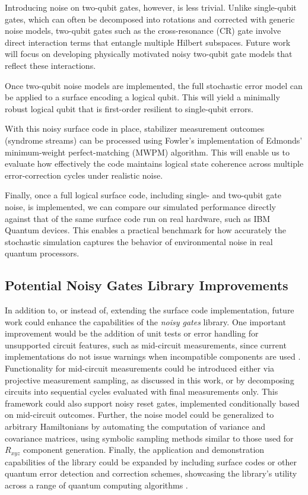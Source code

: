 \documentclass[9pt,a4paper,twocolumn,twoside]{tau-class/tau}
\begin{document}
Introducing noise on two-qubit gates, however, is less trivial. Unlike single-qubit gates, which can often be decomposed into rotations and corrected with generic noise models, two-qubit gates such as the cross-resonance (CR) gate involve direct interaction terms that entangle multiple Hilbert subspaces. Future work will focus on developing physically motivated noisy two-qubit gate models that reflect these interactions.

Once two-qubit noise models are implemented, the full stochastic error model can be applied to a surface encoding a logical qubit. This will yield a minimally robust logical qubit that is first-order resilient to single-qubit errors.

With this noisy surface code in place, stabilizer measurement outcomes (syndrome streams) can be processed using Fowler’s implementation of Edmonds’ minimum-weight perfect-matching (MWPM) algorithm. This will enable us to evaluate how effectively the code maintains logical state coherence across multiple error-correction cycles under realistic noise.

Finally, once a full logical surface code, including single- and two-qubit gate noise, is implemented, we can compare our simulated performance directly against that of the same surface code run on real hardware, such as IBM Quantum devices. This enables a practical benchmark for how accurately the stochastic simulation captures the behavior of environmental noise in real quantum processors.

\subsection*{Potential Noisy Gates Library Improvements}
In addition to, or instead of, extending the surface code implementation, future work could enhance the capabilities of the \textit{noisy gates} library. 
One important improvement would be the addition of unit tests or error handling for unsupported circuit features, such as mid-circuit measurements, since current implementations do not issue warnings when incompatible components are used \cite{quantum_gates_repo}. 
Functionality for mid-circuit measurements could be introduced either via projective measurement sampling, as discussed in this work, or by decomposing circuits into sequential cycles evaluated with final measurements only. This framework could also support noisy reset gates, implemented conditionally based on mid-circuit outcomes. 
Further, the noise model could be generalized to arbitrary Hamiltonians by automating the computation of variance and covariance matrices, using symbolic sampling methods similar to those used for \(R_{xyz}\) component generation. Finally, the application and demonstration capabilities of the library could be expanded by including surface codes or other quantum error detection and correction schemes, showcasing the library's utility across a range of quantum computing algorithms \cite{quantum_gates_repo}.
\end{document}
